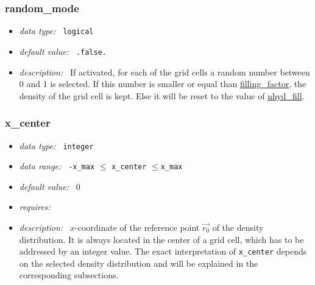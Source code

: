 \documentclass[a4paper,10pt]{article}
\begin{document}
\begin{appendix}
\subsubsection{random\_mode}
\label{hydoptnl:randommode}
\begin{itemize}
 \item \textit{data type:~} \texttt{logical}
 \item \textit{default value:~} \texttt{.false.}
 \item \textit{description:~} If activated, for each of the grid cells a random 
  number between 0 and 1 is selected. If this number is smaller or equal than 
  \hyperref[hydopt:macrofillingfactor]{filling\_factor}, the density of the 
  grid cell is kept. Else it will be reset to the value of 
  \hyperref[hydopt:nhydfill]{nhyd\_fill}.
\end{itemize}


\subsubsection{x\_center}
\label{hydoptnl:xcenter}
\begin{itemize}
 \item \textit{data type:~} \texttt{integer}
 \item \textit{data range:~} \texttt{-x\_max} $ \leq$ \texttt{x\_center} 
  $\leq $\texttt{x\_max} 
 \item \textit{default value:~} 0
 \item \textit{requires:~} 
 \item \textit{description:~} $x$-coordinate of the reference point $\vec{r_0}$
  of the density distribution.  It is always located in the center of a grid 
  cell, which has to be addressed by an integer value. 
  The exact interpretation of \texttt{x\_center} depends on the selected 
  density distribution and will be 
  explained in the corresponding subsections.
\end{itemize}



\end{appendix}
\end{document}
